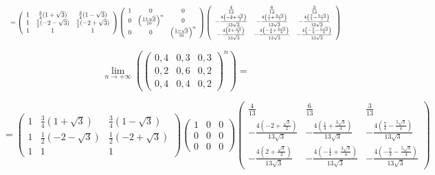 \documentclass[a4paper,12pt]{article} %
\begin{document}
\begin{example}
\[ 
   \resizebox{\hsize}{!}{%
	$=\left(\begin{array}{ccc}
	1 & \frac{3}{4}(1+\sqrt{3}) & \frac{3}{4}(1-\sqrt{3}) \\
	1 & \frac{1}{2}(-2-\sqrt{3}) & \frac{1}{2}(-2+\sqrt{3}) \\
	1 & 1 & 1
\end{array}\right) 
\left(\begin{array}{ccc}
	1 & 0 &  0 \\
	0 & \left(\frac{1+\sqrt{3}}{10}\right)^{n} &  0 \\
	0 & 0 &  \left(\frac{1-\sqrt{3}}{10}\right)^{n}
\end{array}\right)
\left(\begin{array}{ccc}
	\frac{4}{13} & \frac{6}{13} & \frac{3}{13} \\
	-\frac{4\left(-2+\frac{\sqrt{3}}{2}\right)}{13 \sqrt{3}} & -\frac{4\left(\frac{1}{4}+\frac{3 \sqrt{3}}{4}\right)}{13 \sqrt{3}} & -\frac{4\left(\frac{7}{4}-\frac{5 \sqrt{3}}{4}\right)}{13 \sqrt{3}} \\
	-\frac{4\left(2+\frac{\sqrt{3}}{2}\right)}{13 \sqrt{3}} & -\frac{4\left(-\frac{1}{4}+\frac{3 \sqrt{3}}{4}\right)}{13 \sqrt{3}} & -\frac{4\left(-\frac{7}{4}-\frac{5 \sqrt{3}}{4}\right)}{13 \sqrt{3}}
\end{array}\right)
$}
\]





\[ \lim _{n \rightarrow+\infty}\left(\left(\begin{array}{ccc}
0,4 & 0,3 & 0,3 \\
0,2 & 0,6 & 0,2 \\
0,4 & 0,4 & 0,2
\end{array}\right)^{n}\right)= \]



\[ =\left(\begin{array}{ccc}
1 & \frac{3}{4}(1+\sqrt{3}) & \frac{3}{4}(1-\sqrt{3}) \\
1 & \frac{1}{2}(-2-\sqrt{3}) & \frac{1}{2}(-2+\sqrt{3}) \\
1 & 1 & 1
\end{array}\right)
\left(\begin{array}{lll}
	1 & 0 & 0 \\
	0 & 0 & 0 \\
	0 & 0 & 0
\end{array}\right)
\left(\begin{array}{ccc}
	\frac{4}{13} & \frac{6}{13} & \frac{3}{13} \\
	-\frac{4\left(-2+\frac{\sqrt{3}}{2}\right)}{13 \sqrt{3}} & -\frac{4\left(\frac{1}{4}+\frac{3 \sqrt{3}}{4}\right)}{13 \sqrt{3}} & -\frac{4\left(\frac{7}{4}-\frac{5 \sqrt{3}}{4}\right)}{13 \sqrt{3}} \\
	-\frac{4\left(2+\frac{\sqrt{3}}{2}\right)}{13 \sqrt{3}} & -\frac{4\left(-\frac{1}{4}+\frac{3 \sqrt{3}}{4}\right)}{13 \sqrt{3}} & -\frac{4\left(-\frac{7}{4}-\frac{5 \sqrt{3}}{4}\right)}{13 \sqrt{3}}
\end{array}\right)
\]




\end{example}
\end{document}
